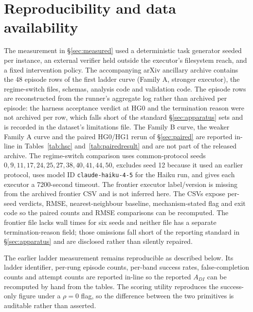 \documentclass[11pt]{article}
\theoremstyle{definition}
\begin{document}
\section*{Reproducibility and data availability}

The measurement in \S\ref{sec:measured} used a deterministic task generator seeded per instance, an external verifier held outside the executor's filesystem reach, and a fixed intervention policy. The accompanying arXiv ancillary archive  contains the 48 episode rows of the first ladder curve (Family A, stronger executor), the regime-switch files, schemas, analysis code and validation code. The episode rows are reconstructed from the runner's aggregate log rather than archived per episode: the harness acceptance verdict at HG0 and the termination reason were not archived per row, which falls short of the standard \S\ref{sec:apparatus} sets and is recorded in the dataset's limitations file. The Family B curve, the weaker Family A curve and the paired HG0/HG1 rerun of \S\ref{sec:paired} are reported in-line in Tables~\ref{tab:hsc} and~\ref{tab:pairedresult} and are not part of the released archive. The regime-switch comparison uses common-protocol seeds $0,9,11,17,24,25,27,38,40,41,44,50$, excludes seed 12 because it used an earlier protocol, uses model ID \texttt{claude-haiku-4-5} for the Haiku run, and gives each executor a 7200-second timeout. The frontier executor label/version is missing from the archived frontier CSV and is not inferred here. The CSVs expose per-seed verdicts, RMSE, nearest-neighbour baseline, mechanism-stated flag and exit code so the paired counts and RMSE comparisons can be recomputed. The frontier file lacks wall times for six seeds and neither file has a separate termination-reason field; those omissions fall short of the reporting standard in \S\ref{sec:apparatus} and are disclosed rather than silently repaired.

The earlier ladder measurement remains reproducible as described below. Its ladder identifier, per-rung episode counts, per-band success rates, false-completion counts and attempt counts are reported in-line so the reported $A_{DI}$ can be recomputed by hand from the tables. The scoring utility reproduces the success-only figure under a $\rho = 0$ flag, so the difference between the two primitives is auditable rather than asserted.
\end{document}
